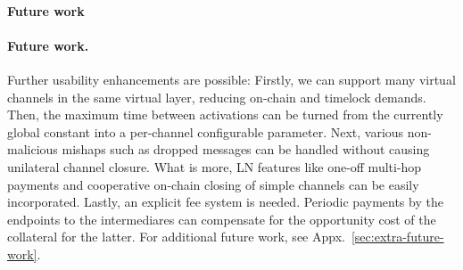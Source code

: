\makeatletter%
%
  {\paragraph{Future work}}%
  {\paragraph{Future work.}}%
\makeatother%
Further usability enhancements are possible: Firstly, we can support many
virtual channels in the same virtual layer, reducing on-chain and timelock
demands. Then, the maximum time between activations can be turned from the
currently global constant into a per-channel configurable parameter. Next,
various non-malicious mishaps such as dropped messages can be handled without
causing unilateral channel closure. What is more, LN features like one-off
multi-hop payments and cooperative on-chain closing of simple channels can be
easily incorporated. Lastly, an explicit fee system is needed. Periodic payments
by the endpoints to the intermediares can compensate for the opportunity cost of
the collateral for the latter. For additional future work, see
Appx.~\ref{sec:extra-future-work}.
